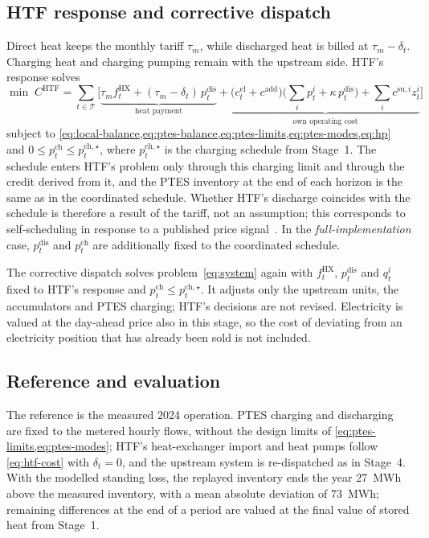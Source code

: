 \subsection{HTF response and corrective dispatch}
\label{sec:response}

Direct heat keeps the monthly tariff $\tau_m$, while discharged heat is billed at $\tau_m-\delta_t$. Charging heat and charging pumping remain with the upstream side. HTF's response solves
\begin{equation}
\min\; C^{\mathrm{HTF}} = \sum_{t\in\mathcal T}\Big[\underbrace{\tau_m f^{\mathrm{HX}}_t + (\tau_m-\delta_t)\,p^{\mathrm{dis}}_t}_{\text{heat payment}} + \underbrace{\big(c^{\mathrm{el}}_t+c^{\mathrm{add}}\big)\Big(\sum_{i} p^i_t + \kappa\,p^{\mathrm{dis}}_t\Big) + \sum_{i} c^{\mathrm{su},i} z^i_t}_{\text{own operating cost}}\Big]
\label{eq:htf-cost}
\end{equation}
subject to \cref{eq:local-balance,eq:ptes-balance,eq:ptes-limits,eq:ptes-modes,eq:hp} and $0\le p^{\mathrm{ch}}_t\le p^{\mathrm{ch},\star}_t$, where $p^{\mathrm{ch},\star}_t$ is the charging schedule from Stage~1. The schedule enters HTF's problem only through this charging limit and through the credit derived from it, and the PTES inventory at the end of each horizon is the same as in the coordinated schedule. Whether HTF's discharge coincides with the schedule is therefore a result of the tariff, not an assumption; this corresponds to self-scheduling in response to a published price signal~\cite{frolke2022market}. In the \emph{full-implementation} case, $p^{\mathrm{dis}}_t$ and $p^{\mathrm{ch}}_t$ are additionally fixed to the coordinated schedule.

The corrective dispatch solves problem~\eqref{eq:system} again with $f^{\mathrm{HX}}_t$, $p^{\mathrm{dis}}_t$ and $q^i_t$ fixed to HTF's response and $p^{\mathrm{ch}}_t\le p^{\mathrm{ch},\star}_t$. It adjusts only the upstream units, the accumulators and PTES charging; HTF's decisions are not revised. Electricity is valued at the day-ahead price also in this stage, so the cost of deviating from an electricity position that has already been sold is not included.

\subsection{Reference and evaluation}
\label{sec:reference}

The reference is the measured 2024 operation. PTES charging and discharging are fixed to the metered hourly flows, without the design limits of \cref{eq:ptes-limits,eq:ptes-modes}; HTF's heat-exchanger import and heat pumps follow \cref{eq:htf-cost} with $\delta_t=0$, and the upstream system is re-dispatched as in Stage~4. With the modelled standing loss, the replayed inventory ends the year 27~MWh above the measured inventory, with a mean absolute deviation of 73~MWh; remaining differences at the end of a period are valued at the final value of stored heat from Stage~1.

